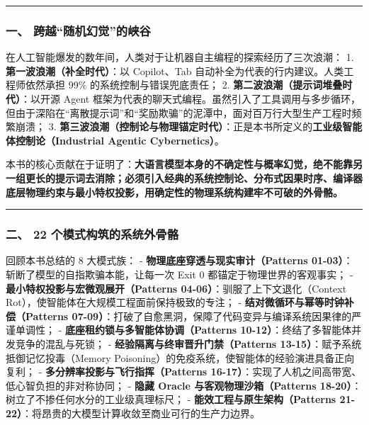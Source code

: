 \begin{center}\rule{0.5\linewidth}{0.5pt}\end{center}

\subsubsection{一、
跨越``随机幻觉''的峡谷}\label{ux4e00-ux8de8ux8d8aux968fux673aux5e7bux89c9ux7684ux5ce1ux8c37}

在人工智能爆发的数年间，人类对于让机器自主编程的探索经历了三次浪潮： 1.
\textbf{第一波浪潮（补全时代）}：以 Copilot、Tab
自动补全为代表的行内建议。人类工程师依然承担 99\%
的系统控制与错误兜底责任； 2.
\textbf{第二波浪潮（提示词堆叠时代）}：以开源 Agent
框架为代表的聊天式编程。虽然引入了工具调用与多步循环，但由于深陷在``离散提示词''和``奖励欺骗''的泥潭中，面对百万行大型生产工程时频繁崩溃；
3.
\textbf{第三波浪潮（控制论与物理锚定时代）}：正是本书所定义的\textbf{工业级智能体控制论（Industrial
Agentic Cybernetics）}。

本书的核心贡献在于证明了：\textbf{大语言模型本身的不确定性与概率幻觉，绝不能靠另一组更长的提示词去消除；必须引入经典的系统控制论、分布式因果时序、编译器底层物理约束与最小特权投影，用确定性的物理系统构建牢不可破的外骨骼。}

\begin{center}\rule{0.5\linewidth}{0.5pt}\end{center}

\subsubsection{二、 22
个模式构筑的系统外骨骼}\label{ux4e8c-22-ux4e2aux6a21ux5f0fux6784ux7b51ux7684ux7cfbux7edfux5916ux9aa8ux9abc}

回顾本书总结的 8 大模式族： - \textbf{物理底座穿透与现实审计（Patterns
01-03）}：斩断了模型的自指欺骗本能，让每一次 Exit 0
都锚定于物理世界的客观事实； -
\textbf{最小特权投影与宏微观展开（Patterns
04-06）}：驯服了上下文退化（Context
Rot），使智能体在大规模工程面前保持极致的专注； -
\textbf{结对微循环与幂等时钟补偿（Patterns
07-09）}：打破了自愈黑洞，保障了代码变异与编译系统因果律的严谨单调性； -
\textbf{底座租约锁与多智能体协调（Patterns
10-12）}：终结了多智能体并发竞争的混乱与死锁； -
\textbf{经验隔离与终审晋升门禁（Patterns
13-15）}：赋予系统抵御记忆投毒（Memory
Poisoning）的免疫系统，使智能体的经验演进具备正向复利； -
\textbf{多分辨率投影与飞行指挥（Patterns
16-17）}：实现了人机之间高带宽、低心智负担的非对称协同； - \textbf{隐藏
Oracle 与客观物理沙箱（Patterns
18-20）}：树立了不掺任何水分的工业级真理标尺； -
\textbf{能效工程与原生架构（Patterns
21-22）}：将昂贵的大模型计算收敛至商业可行的生产力边界。

